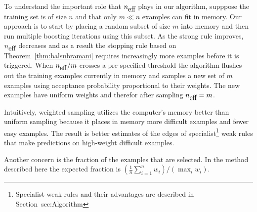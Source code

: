 To understand the important role that ${n_{\mbox{eff}}}$ plays in our algorithm,
supppose the training set is of size $n$ and that only $m \ll n$
examples can fit in memory. Our approach is to start by placing a
random subset of size $m$ into memory and then run multiple
boosting iterations using this subset. As the strong rule improves,
${n_{\mbox{eff}}}$ decreases and as a result the stopping rule based on
Theorem~\ref{thm:balsubramani} requires increasingly more examples
before it is triggered. When ${n_{\mbox{eff}}}/m$ crosses a pre-specified
threshold the algorithm flushes out the training examples currently in
memory and samples a new set of $m$ examples using acceptance
probability proportional to their weights. The new examples have
uniform weights and therefor after sampling ${n_{\mbox{eff}}}=m$.

Intuitively, weighted sampling utilizes the computer's memory better
than uniform sampling because it places in memory more difficult
examples and fewer easy examples. The result is better estimates of
the edges of specialist\footnote{Specialist weak rules and their
  advantages are described in Section~{sec:Algorithm}} weak rules that
make predictions on high-weight difficult examples.


Another concern is the fraction of the examples that are selected. In
the method described here the expected fraction is $(\frac{1}{n}
\sum_{i=1}^n w_i)/(\max_i w_i)$.
